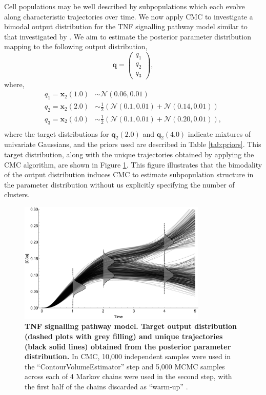 Cell populations may be well described by subpopulations which each evolve along characteristic trajectories over time. We now apply CMC to investigate a bimodal output distribution for the TNF signalling pathway model similar to that investigated by \cite{hasenauer2011identification}. We aim to estimate the posterior parameter distribution mapping to the following output distribution,
%
\begin{equation}
\boldsymbol{q} = \begin{pmatrix} q_1 \\ q_2 \\ q_3 \end{pmatrix},
\end{equation}
where,
\begin{equation}
\begin{aligned}
q_1 = \boldsymbol{x}_2(1.0) &\sim \mathcal{N}(0.06, 0.01)\\
q_2 = \boldsymbol{x}_2(2.0) &\sim\frac{1}{2}\left(\mathcal{N}(0.1, 0.01) + \mathcal{N}(0.14, 0.01)\right)\\
q_3 = \boldsymbol{x}_2(4.0) &\sim\frac{1}{2}\left(\mathcal{N}(0.1, 0.01) + \mathcal{N}(0.20, 0.01)\right),\\
\end{aligned}
\end{equation}
%
where the target distributions for $\boldsymbol{q}_2(2.0)$ and $\boldsymbol{q}_2(4.0)$ indicate mixtures of univariate Gaussians, and the priors used are described in Table \ref{tab:priors}. This target distribution, along with the unique trajectories obtained by applying the CMC algorithm, are shown in Figure \ref{fig:tnf_samples_vs_distribution}. This figure illustrates that the bimodality of the output distribution induces CMC to estimate subpopulation structure in the parameter distribution without us explicitly specifying the number of clusters.

\begin{figure}[H]
	\centerline{\includegraphics[width=0.8\textwidth]{../figures/tnf_samples_vs_distribution.pdf}}
	\caption{\textbf{TNF signalling pathway model. Target output distribution (dashed plots with grey filling) and unique trajectories (black solid lines) obtained from the posterior parameter distribution.} In CMC, 10,000 independent samples were used in the ``ContourVolumeEstimator'' step and 5,000 MCMC samples across each of 4 Markov chains were used in the second step, with the first half of the chains discarded as ``warm-up'' \cite{lambert2018Student}.}
	\label{fig:tnf_samples_vs_distribution}
\end{figure}

